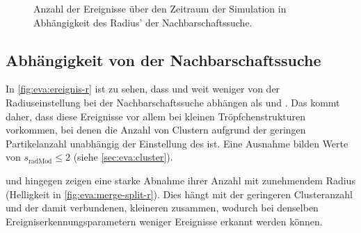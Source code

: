 \begin{figure}
	{\caption{Anzahl der Ereignisse über den Zeitraum der Simulation in Abhängigkeit des Radius' der Nachbarschaftssuche.}\label{fig:eva:ereignis-r}}
\end{figure}

\subsection*{Abhängigkeit von der Nachbarschaftssuche}
In \autoref{fig:eva:ereignis-r} ist zu sehen, dass  und  weit weniger von der Radiuseinstellung bei der Nachbarschaftssuche abhängen als  und . Das kommt daher, dass diese Ereignisse vor allem bei kleinen Tröpfchenstrukturen vorkommen, bei denen die Anzahl von Clustern aufgrund der geringen Partikelanzahl unabhängig der Einstellung des   ist. Eine Ausnahme bilden Werte von $s_\text{radMod} \le 2$ (siehe \autoref{sec:eva:cluster}).

 und  hingegen zeigen eine starke Abnahme ihrer Anzahl mit zunehmendem Radius (Helligkeit in \autoref{fig:eva:merge-split-r}). Dies hängt mit der geringeren Clusteranzahl und der damit verbundenen, kleineren  zusammen, wodurch bei denselben Ereigniserkennungsparametern weniger Ereignisse erkannt werden können.

